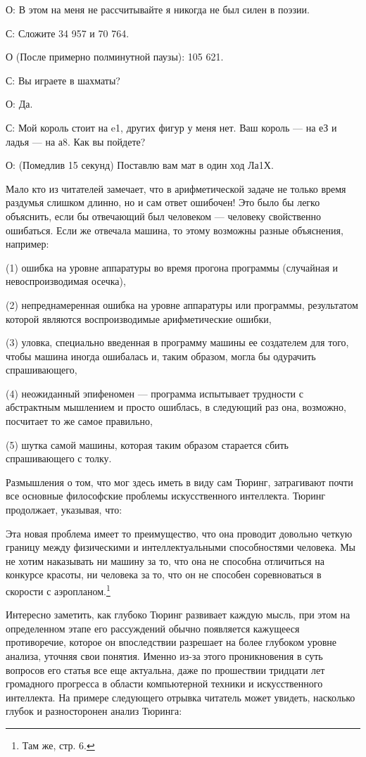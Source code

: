 \documentclass[../main.tex]{subfiles}
\begin{document}
О: В этом на меня не рассчитывайте я никогда не был силен в поэзии.

С: Сложите 34 957 и 70 764.

О (После примерно полминутной паузы): 105 621.

С: Вы играете в шахматы?

О: Да.

С: Мой король стоит на e1, других фигур у меня нет. Ваш король --- на еЗ и ладья --- на а8. Как вы пойдете?

О: (Помедлив 15 секунд) Поставлю вам мат в один ход Ла1Х.

Мало кто из читателей замечает, что в арифметической задаче не только время раздумья слишком длинно, но и сам ответ ошибочен! Это было бы легко объяснить, если бы отвечающий был человеком --- человеку свойственно ошибаться. Если же отвечала машина, то этому возможны разные объяснения, например:

(1) ошибка на уровне аппаратуры во время прогона программы (случайная и невоспроизводимая осечка),

(2) непреднамеренная ошибка на уровне аппаратуры или программы, результатом которой являются воспроизводимые арифметические ошибки,

(3) уловка, специально введенная в программу машины ее создателем для того, чтобы машина иногда ошибалась и, таким образом, могла бы одурачить спрашивающего,

(4) неожиданный эпифеномен --- программа испытывает трудности с абстрактным мышлением и просто ошиблась, в следующий раз она, возможно, посчитает то же самое правильно,

(5) шутка самой машины, которая таким образом старается сбить спрашивающего с толку.

Размышления о том, что мог здесь иметь в виду сам Тюринг, затрагивают почти все основные философские проблемы искусственного интеллекта. Тюринг продолжает, указывая, что:

Эта новая проблема имеет то преимущество, что она проводит довольно четкую границу между физическими и интеллектуальными способностями человека. Мы не хотим наказывать ни машину за то, что она не способна отличиться на конкурсе красоты, ни человека за то, что он не способен соревноваться в скорости с аэропланом.\footnote{Там же, стр. 6.}

Интересно заметить, как глубоко Тюринг развивает каждую мысль, при этом на определенном этапе его рассуждений обычно появляется кажущееся противоречие, которое он впоследствии разрешает на более глубоком уровне анализа, уточняя свои понятия. Именно из-за этого проникновения в суть вопросов его статья все еще актуальна, даже по прошествии тридцати лет громадного прогресса в области компьютерной техники и искусственного интеллекта. На примере следующего отрывка читатель может увидеть, насколько глубок и разносторонен анализ Тюринга:
\end{document}
